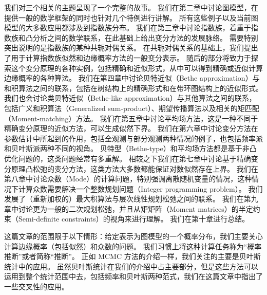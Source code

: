 我们对三个相关的主题呈现了一个完整的故事。
我们在第二章中讨论图模型，在提供一般的数学框架的同时也针对几个特例进行讲解。
所有这些例子以及当前图模型的大多数应用都涉及到指数族分布。
我们在第三章中讨论指数族，着重于指数族和凸分析之间的数学联系，在此基础上给出变分方法的发展脉络。
需要特别突出说明的是指数族的某种共轭对偶关系。
在共轭对偶关系的基础上，我们提出了用于计算指数族似然和边缘概率方法的一般变分表示。
随后的部分将致力于探索这个变分原理的各种实例，包括精确和近似形式，从中可以得到精确或近似计算边缘概率的各种算法。
我们在第四章中讨论贝特近似（Bethe approximation）与和积算法之间的联系，包括在树结构上的精确形式和在带环图结构上的近似形式。
我们也会讨论类贝特近似（Bethe-like approximation）与其他算法之间的联系，包括广义和积算法（Generalized sum-product）、期望传播算法以及相关的矩匹配（Moment-matching）方法。
我们在第五章中讨论平均场方法，这是一种不同于精确变分原理的近似方法，可以生成似然下界。
我们在第六章中讨论变分方法在参数估计中所起到的作用，包括全观测与部分观测两种情况的例子，也包括频率派和贝叶斯派两种不同的视角。
贝特型（Bethe-type）和平均场方法都是基于非凸优化问题的，这类问题经常有多重解。
相较之下我们在第七章中讨论基于精确变分原理凸松弛的变分方法，这类方法大多数都能保证对数似然存在上界。
我们在第八章中讨论众数（Mode）的计算问题，特别强调离散随机变量的情况，这种情况下计算众数需要解决一个整数规划问题（Integer programming problem）。
我们发展了（重新加权的）最大积算法与层次线性规划松弛之间的联系。
我们在第九章中讨论更为一般的二次规划松弛，并且从矩矩阵（Moment matrices）的半定约束（Semi-definite constraints）的视角来进行理解。
我们在第十章进行总结。

这篇文章的范围限于以下情形：给定表示为图模型的一个概率分布，我们主要关心计算边缘概率（包括似然）和众数的问题。
我们习惯上将这种计算任务称为“概率推断”或者简称“推断”。
正如 MCMC 方法的介绍一样，我们关注的主要是贝叶斯统计中的应用。
虽然贝叶斯统计在我们的介绍中占主要部分，但是这些方法可以运用到整个统计范围中去，包括频率和贝叶斯两种范式，我们在这篇文章中指出了一些交叉性的应用。


